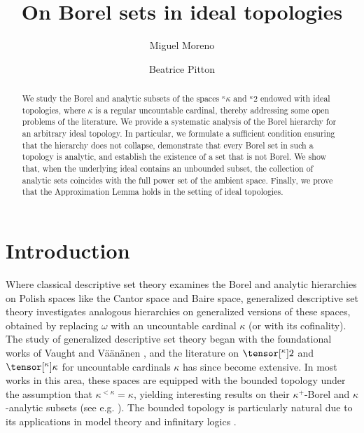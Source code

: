 \documentclass{amsart}
\title{On Borel sets in ideal topologies}
\author{Miguel Moreno}
\author{Beatrice Pitton}
\numberwithin{equation}{section}
\newcommand{\pre}[2]{\tensor[^{#1}]{#2}{}}
\newcommand{\1}{\mathbf{I}}
\newcommand{\2}{\mathbf{II}}
\theoremstyle{definition}
\theoremstyle{remark}
\begin{document}
\begin{abstract}

We study the Borel and analytic subsets of the spaces \({}^{\kappa}\kappa\) and \({}^{\kappa}2\) endowed with ideal topologies, where \(\kappa\) is a regular uncountable cardinal,  thereby addressing some open problems of the literature. 
We provide a systematic analysis of the Borel hierarchy for an arbitrary ideal topology. In particular, we formulate a sufficient condition ensuring that
the hierarchy does not collapse, demonstrate that every Borel set in such a topology is analytic, and establish the existence of a set that is not Borel. We show that, when the underlying ideal contains an unbounded subset, the collection of analytic sets coincides with the full power set of the ambient space. 
Finally, we prove that the Approximation Lemma holds in the setting of ideal topologies.


\end{abstract}



\maketitle




\section{Introduction}

Where classical descriptive set theory examines the Borel and analytic hierarchies on Polish spaces like the Cantor space and Baire space, generalized descriptive set theory investigates analogous hierarchies on generalized versions of these spaces, obtained by replacing \(\omega\) with an uncountable cardinal \(\kappa\) (or with its cofinality). 
The study of generalized descriptive set theory began with the foundational works of Vaught \cite{Vau75} and Väänänen \cite{MR1110032}, and the literature on \(\pre{\kappa}{2}\) and \(\pre{\kappa}{\kappa}\) for uncountable cardinals \(\kappa\) has since become extensive. 
In most works in this area, these spaces are equipped with the bounded topology under the assumption that \(\kappa^{<\kappa}=\kappa\), yielding interesting results on their \(\kappa^+\)-Borel and \(\kappa\)-analytic subsets (see e.g. \cite{MV, FHK14, HK, LS15, ACMRP}). 
The bounded topology is particularly natural due to its applications in model theory and infinitary logics \cite{Vau75, MV, SV00, She01, SV02, She04, DV11, FHK14, MMR21, Mor23}.
\end{document}
